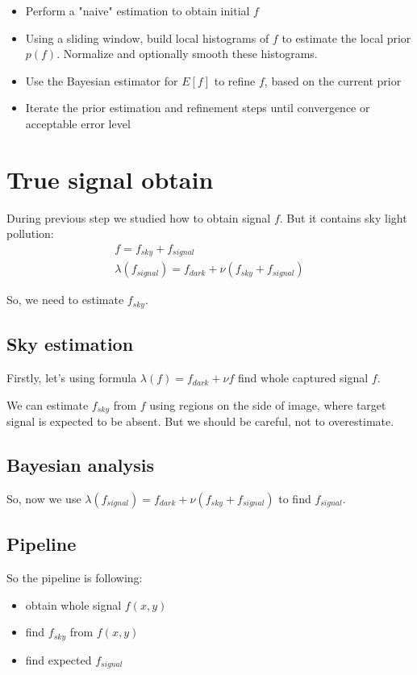 \documentclass{article}
\begin{document}
\begin{itemize}
    \item Perform a "naive" estimation to obtain initial $f$
    \item Using a sliding window, build local histograms of $f$ to estimate the local prior $p(f)$. Normalize and optionally smooth these histograms.
    \item Use the Bayesian estimator for $E\left[ f \right]$ to refine $f$, based on the current prior
    \item Iterate the prior estimation and refinement steps until convergence or acceptable error level
\end{itemize}

\section{True signal obtain}

During previous step we studied how to obtain signal $f$. But it contains sky light pollution:
\begin{eqnarray}
    f = f_{sky} + f_{signal} \\
    \lambda(f_{signal}) = f_{dark} + \nu \left( f_{sky} + f_{signal} \right)
\end{eqnarray}

So, we need to estimate $f_{sky}$.

\subsection{Sky estimation}
Firstly, let's using formula $\lambda(f) = f_{dark} + \nu f$ find whole captured signal $f$.

We can estimate $f_{sky}$ from $f$ using regions on the side of image, where target signal is expected to be absent.
But we should be careful, not to overestimate.

\subsection{Bayesian analysis}

So, now we use $\lambda(f_{signal}) = f_{dark} + \nu \left( f_{sky} + f_{signal} \right)$ to find $f_{signal}$.

\subsection{Pipeline}
So the pipeline is following:

\begin{itemize}
    \item obtain whole signal $f(x,y)$
    \item find $f_{sky}$ from $f(x,y)$
    \item find expected $f_{signal}$
\end{itemize}
\end{document}
